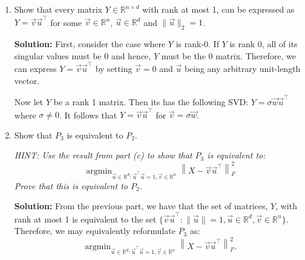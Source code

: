 \documentclass[10pt]{article}
\theoremstyle{definition}
\theoremstyle{plain}
\newcommand{\RR}{\mathbb{R}}
\DeclareMathOperator{\argmin}{argmin}
\DeclareMathOperator{\argmax}{argmax}
\begin{document}
\begin{enumerate}[label=(\alph*)]
\textit{HINT: Start with $P_2$ and using the result from part (a) show that it is equivalent to $P_1$.}

\textbf{Solution:} From part (a), we have the following decomposition of $P_2$:
\begin{align}
\argmin_{\vec{u} \in \RR^d : \vec{u}^\top \vec{u} = 1} \sum_{i=1}^{n} \min_{v_i \in \RR} \|\vec{x}_i - v_i u\|_2^2
&= \argmin_{\vec{u} \in \RR^d : \vec{u}^\top \vec{u} = 1} \sum_{i=1}^{n} \left[\|\vec{x}_i\|_2^2 - (\vec{x}_i^\top \vec{u})^2\right] \\
&= \argmax_{\vec{u} \in \RR^d : \vec{u}^\top \vec{u} = 1} \sum_{i=1}^{n} \vec{u}^\top \vec{x}_i \vec{x}_i^\top \vec{u} \\
&= \argmax_{\vec{u} \in \RR^d : \vec{u}^\top \vec{u} = 1} \vec{u}^\top C \vec{u}.
\end{align}
From the above equation, we see that a solution for $P_1$ constitutes a solution for $P_2$ and vice-versa.

\item Show that every matrix $Y \in \RR^{n \times d}$ with rank at most 1, can be expressed as $Y = \vec{v}\vec{u}^\top$ for some $\vec{v} \in \RR^n$, $\vec{u} \in \RR^d$ and $\|\vec{u}\|_2 = 1$.

\textbf{Solution:} First, consider the case where $Y$ is rank-0. If $Y$ is rank 0, all of its singular values must be 0 and hence, $Y$ must be the 0 matrix. Therefore, we can express $Y = \vec{v}\vec{u}^\top$ by setting $\vec{v} = 0$ and $\vec{u}$ being any arbitrary unit-length vector.

Now let $Y$ be a rank 1 matrix. Then its has the following SVD: $Y = \sigma \vec{w}\vec{u}^\top$ where $\sigma \neq 0$. It follows that $Y = \vec{v}\vec{u}^\top$ for $\vec{v} = \sigma \vec{w}$.

\item Show that $P_3$ is equivalent to $P_2$.

\textit{HINT: Use the result from part (c) to show that $P_3$ is equivalent to:}
\begin{equation}
\argmin_{\vec{u} \in \RR^d : \vec{u}^\top \vec{u} = 1, \vec{v} \in \RR^n} \left\|X - \vec{v}\vec{u}^\top\right\|_F^2
\end{equation}
\textit{Prove that this is equivalent to $P_2$.}

\textbf{Solution:} From the previous part, we have that the set of matrices, $Y$, with rank at most 1 is equivalent to the set $\{\vec{v}\vec{u}^\top : \|\vec{u}\| = 1, \vec{u} \in \RR^d, \vec{v} \in \RR^n\}$. Therefore, we may equivalently reformulate $P_3$ as:
\begin{equation}
\argmin_{\vec{u} \in \RR^d : \vec{u}^\top \vec{u} = 1, \vec{v} \in \RR^n} \left\|X - \vec{v}\vec{u}^\top\right\|_F^2.
\end{equation}


\end{enumerate}
\end{document}
